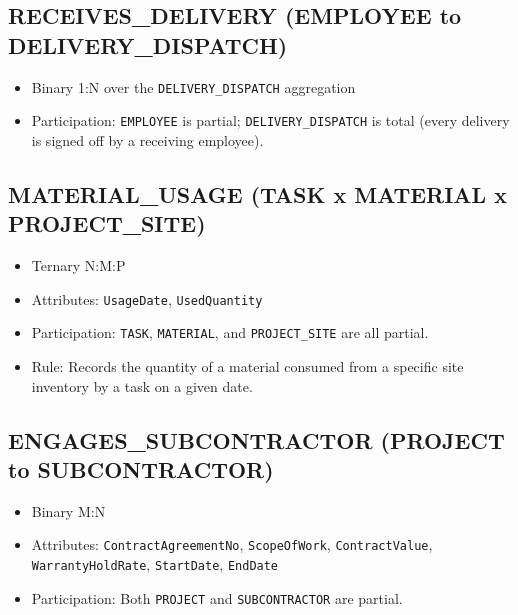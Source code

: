 \documentclass[a4paper,12pt]{report}
\providecommand{\tightlist}{%
  \setlength{\itemsep}{0pt}\setlength{\parskip}{0pt}}
\begin{document}
\subsection{\texorpdfstring{RECEIVES\texorpdfstring{\_\allowbreak{}}{_}DELIVERY (EMPLOYEE to DELIVERY\texorpdfstring{\_\allowbreak{}}{_}DISPATCH)}{RECEIVESDELIVERY (EMPLOYEE to DELIVERYDISPATCH)}}\label{receives_delivery-employee-to-delivery_dispatch}

\begin{itemize}
\tightlist
\item
  Binary 1:N over the \texttt{DELIVERY\_\allowbreak{}DISPATCH} aggregation
\item
  Participation: \texttt{EMPLOYEE} is partial; \texttt{DELIVERY\_\allowbreak{}DISPATCH} is total (\allowbreak{}every delivery is signed off by a receiving employee).
\end{itemize}

\subsection{\texorpdfstring{MATERIAL\texorpdfstring{\_\allowbreak{}}{_}USAGE (TASK x MATERIAL x PROJECT\texorpdfstring{\_\allowbreak{}}{_}SITE)}{MATERIALUSAGE (TASK x MATERIAL x PROJECTSITE)}}\label{material_usage-task-x-material-x-project_site}

\begin{itemize}
\tightlist
\item
  Ternary N:M:P
\item
  Attributes: \texttt{UsageDate}, \texttt{UsedQuantity}
\item
  Participation: \texttt{TASK}, \texttt{MATERIAL}, and \texttt{PROJECT\_\allowbreak{}SITE} are all partial.
\item
  Rule: Records the quantity of a material consumed from a specific site inventory by a task on a given date.
\end{itemize}

\subsection{\texorpdfstring{ENGAGES\texorpdfstring{\_\allowbreak{}}{_}SUBCONTRACTOR (PROJECT to SUBCONTRACTOR)}{ENGAGESSUBCONTRACTOR (PROJECT to SUBCONTRACTOR)}}\label{engages_subcontractor-project-to-subcontractor}

\begin{itemize}
\tightlist
\item
  Binary M:N
\item
  Attributes: \texttt{ContractAgreementNo}, \texttt{ScopeOfWork}, \texttt{ContractValue}, \texttt{WarrantyHoldRate}, \texttt{StartDate}, \texttt{EndDate}
\item
  Participation: Both \texttt{PROJECT} and \texttt{SUBCONTRACTOR} are partial.
\end{itemize}
\end{document}
